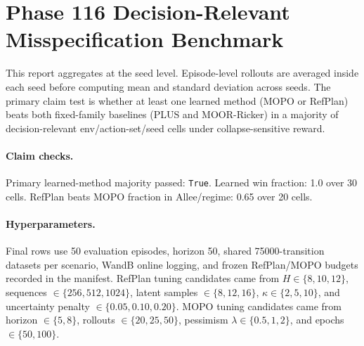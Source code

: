 \documentclass{article}
\begin{document}
\section*{Phase 116 Decision-Relevant Misspecification Benchmark}

This report aggregates at the seed level. Episode-level rollouts are averaged
inside each seed before computing mean and standard deviation across seeds.
The primary claim test is whether at least one learned method (MOPO or RefPlan)
beats both fixed-family baselines (PLUS and MOOR-Ricker) in a majority of
decision-relevant env/action-set/seed cells under collapse-sensitive reward.

\paragraph{Claim checks.}
Primary learned-method majority passed: \texttt{True}.
Learned win fraction: 1.0 over
30 cells. RefPlan beats MOPO fraction in Allee/regime:
0.65 over 20
cells.

\paragraph{Hyperparameters.}
Final rows use 50 evaluation episodes,
horizon 50, shared
75000-transition datasets per scenario, WandB online
logging, and frozen RefPlan/MOPO budgets recorded in the manifest. RefPlan
tuning candidates came from
$H\in\{8,10,12\}$, sequences $\in\{256,512,1024\}$, latent samples
$\in\{8,12,16\}$, $\kappa\in\{2,5,10\}$, and uncertainty penalty
$\in\{0.05,0.10,0.20\}$. MOPO tuning candidates came from horizon
$\in\{5,8\}$, rollouts $\in\{20,25,50\}$, pessimism $\lambda\in\{0.5,1,2\}$,
and epochs $\in\{50,100\}$.
\end{document}
